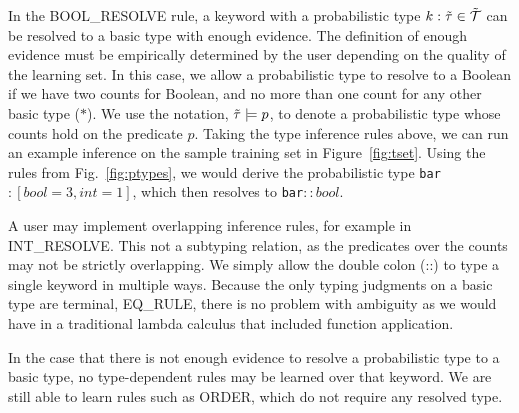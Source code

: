 In the {\scriptsize BOOL\_RESOLVE} rule, a keyword with a probabilistic type $k : \tilde{\tau} \in \tilde{\mathcal{T}}$ can be resolved to a basic type with enough evidence.
The definition of enough evidence must be empirically determined by the user depending on the quality of the learning set.
In this case, we allow a probabilistic type to resolve to a Boolean if we have two counts for Boolean, and no more than one count for any other basic type ($\ast$).
We use the notation, $\tilde{\tau} \models p$, to denote a probabilistic type whose counts hold on the predicate $p$.
Taking the type inference rules above, we can run an example inference on the sample training set in Figure~\ref{fig:tset}.
Using the rules from Fig.~\ref{fig:ptypes}, we would derive the probabilistic type \texttt{bar}$:[bool=3,int=1]$, which then resolves to \texttt{bar}$::bool$.
 
A user may implement overlapping inference rules, for example in {\scriptsize INT\_RESOLVE}.
This not a subtyping relation, as the predicates over the counts may not be strictly overlapping.
We simply allow the double colon (::) to type a single keyword in multiple ways.
Because the only typing judgments on a basic type are terminal, {\scriptsize EQ\_RULE}, there is no problem with ambiguity as we would have in a traditional lambda calculus that included function application.


In the case that there is not enough evidence to resolve a probabilistic type to a basic type, no type-dependent rules may be learned over that keyword.
We are still able to learn rules such as {\scriptsize ORDER}, which do not require any resolved type. 


